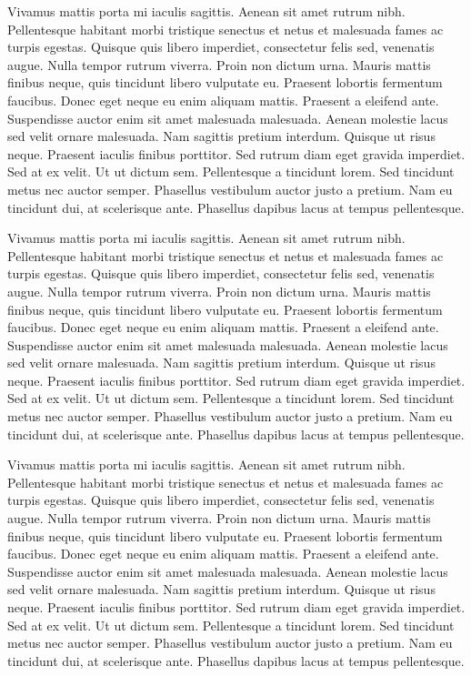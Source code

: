 Vivamus mattis porta mi iaculis sagittis. Aenean sit amet rutrum nibh. Pellentesque habitant morbi tristique senectus et netus et malesuada fames ac turpis egestas. Quisque quis libero imperdiet, consectetur felis sed, venenatis augue. Nulla tempor rutrum viverra. Proin non dictum urna. Mauris mattis finibus neque, quis tincidunt libero vulputate eu. Praesent lobortis fermentum faucibus. Donec eget neque eu enim aliquam mattis. Praesent a eleifend ante. Suspendisse auctor enim sit amet malesuada malesuada. Aenean molestie lacus sed velit ornare malesuada. Nam sagittis pretium interdum.
Quisque ut risus neque. Praesent iaculis finibus porttitor. Sed rutrum diam eget gravida imperdiet. Sed at ex velit. Ut ut dictum sem. Pellentesque a tincidunt lorem. Sed tincidunt metus nec auctor semper. Phasellus vestibulum auctor justo a pretium. Nam eu tincidunt dui, at scelerisque ante. Phasellus dapibus lacus at tempus pellentesque.

Vivamus mattis porta mi iaculis sagittis. Aenean sit amet rutrum nibh. Pellentesque habitant morbi tristique senectus et netus et malesuada fames ac turpis egestas. Quisque quis libero imperdiet, consectetur felis sed, venenatis augue. Nulla tempor rutrum viverra. Proin non dictum urna. Mauris mattis finibus neque, quis tincidunt libero vulputate eu. Praesent lobortis fermentum faucibus. Donec eget neque eu enim aliquam mattis. Praesent a eleifend ante. Suspendisse auctor enim sit amet malesuada malesuada. Aenean molestie lacus sed velit ornare malesuada. Nam sagittis pretium interdum.
Quisque ut risus neque. Praesent iaculis finibus porttitor. Sed rutrum diam eget gravida imperdiet. Sed at ex velit. Ut ut dictum sem. Pellentesque a tincidunt lorem. Sed tincidunt metus nec auctor semper. Phasellus vestibulum auctor justo a pretium. Nam eu tincidunt dui, at scelerisque ante. Phasellus dapibus lacus at tempus pellentesque.

Vivamus mattis porta mi iaculis sagittis. Aenean sit amet rutrum nibh. Pellentesque habitant morbi tristique senectus et netus et malesuada fames ac turpis egestas. Quisque quis libero imperdiet, consectetur felis sed, venenatis augue. Nulla tempor rutrum viverra. Proin non dictum urna. Mauris mattis finibus neque, quis tincidunt libero vulputate eu. Praesent lobortis fermentum faucibus. Donec eget neque eu enim aliquam mattis. Praesent a eleifend ante. Suspendisse auctor enim sit amet malesuada malesuada. Aenean molestie lacus sed velit ornare malesuada. Nam sagittis pretium interdum.
Quisque ut risus neque. Praesent iaculis finibus porttitor. Sed rutrum diam eget gravida imperdiet. Sed at ex velit. Ut ut dictum sem. Pellentesque a tincidunt lorem. Sed tincidunt metus nec auctor semper. Phasellus vestibulum auctor justo a pretium. Nam eu tincidunt dui, at scelerisque ante. Phasellus dapibus lacus at tempus pellentesque.

